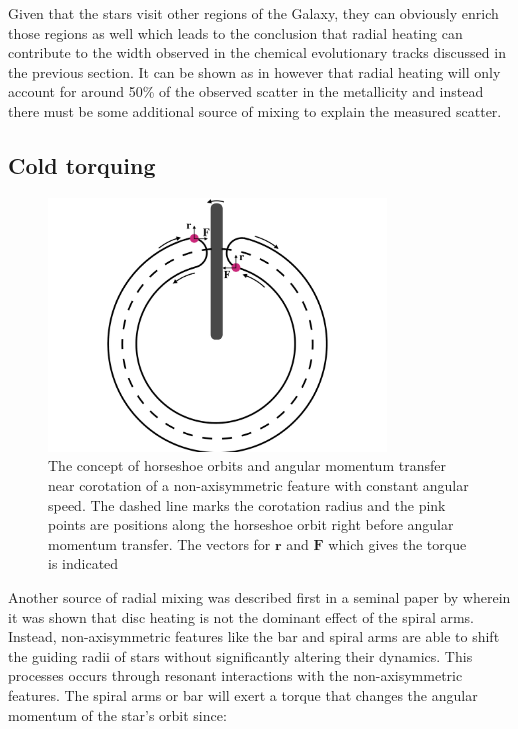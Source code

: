 Given that the stars visit other regions of the Galaxy, they can obviously enrich those regions as well which leads to the conclusion that radial heating can contribute to the width observed in the chemical evolutionary tracks discussed in the previous section. It can be shown as in \cite{binney:07} however that radial heating will only account for around 50\% of the observed scatter in the metallicity and instead there must be some additional source of mixing to explain the measured scatter. 

\subsection{Cold torquing}
\begin{figure}[t]
    \centering
    \includegraphics[width=0.8\textwidth]{images/torquing.pdf}
    \caption{The concept of horseshoe orbits and angular momentum transfer near corotation of a non-axisymmetric feature with constant angular speed. The dashed line marks the corotation radius and the pink points are positions along the horseshoe orbit right before angular momentum transfer. The vectors for $\pmb{r}$ and $\pmb{F}$ which gives the torque is indicated} %
    \label{fig:torquing}
\end{figure}
Another source of radial mixing was described first in a seminal paper by \cite{sellwood:02} wherein it was shown that disc heating is not the dominant effect of the spiral arms. Instead, non-axisymmetric features like the bar and spiral arms are able to shift the guiding radii of stars without significantly altering their dynamics. This processes occurs through resonant interactions with the non-axisymmetric features. The spiral arms or bar will exert a torque that changes the angular momentum of the star's orbit since:
